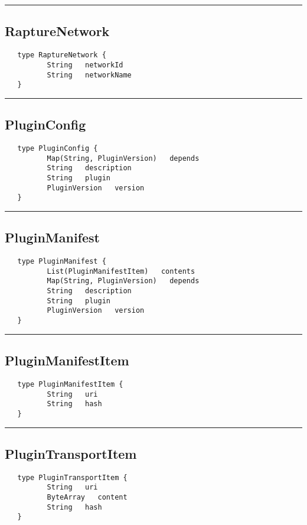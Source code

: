 \rule{15cm}{2pt}
\subsection{RaptureNetwork}
\label{type:RaptureNetwork}

\begin{verbatim}
   type RaptureNetwork {
          String   networkId
          String   networkName
   }
\end{verbatim}

\rule{15cm}{2pt}
\subsection{PluginConfig}
\label{type:PluginConfig}

\begin{verbatim}
   type PluginConfig {
          Map(String, PluginVersion)   depends
          String   description
          String   plugin
          PluginVersion   version
   }
\end{verbatim}

\rule{15cm}{2pt}
\subsection{PluginManifest}
\label{type:PluginManifest}

\begin{verbatim}
   type PluginManifest {
          List(PluginManifestItem)   contents
          Map(String, PluginVersion)   depends
          String   description
          String   plugin
          PluginVersion   version
   }
\end{verbatim}

\rule{15cm}{2pt}
\subsection{PluginManifestItem}
\label{type:PluginManifestItem}

\begin{verbatim}
   type PluginManifestItem {
          String   uri
          String   hash
   }
\end{verbatim}

\rule{15cm}{2pt}
\subsection{PluginTransportItem}
\label{type:PluginTransportItem}

\begin{verbatim}
   type PluginTransportItem {
          String   uri
          ByteArray   content
          String   hash
   }
\end{verbatim}

